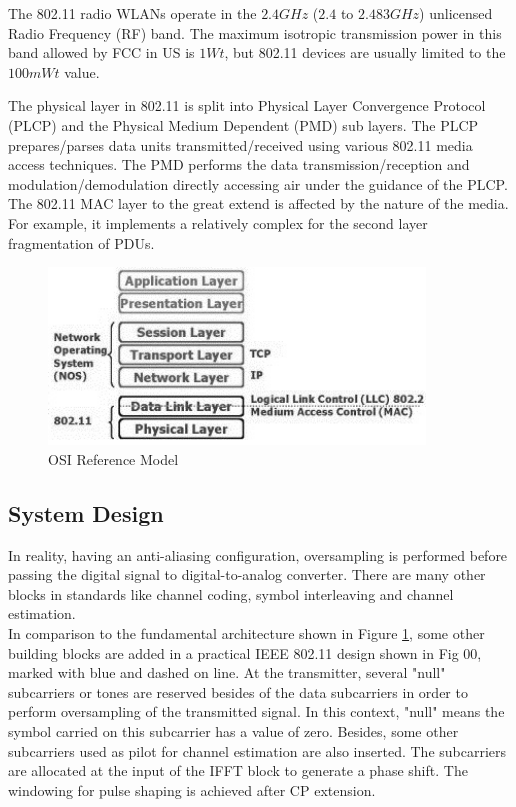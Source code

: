 The 802.11 radio WLANs operate in the $2.4 GHz$ ($2.4$ to $2.483 GHz$) unlicensed Radio Frequency (RF) band. The maximum isotropic transmission power in this band allowed by FCC in US is $1 Wt$, but 802.11 devices are usually limited to the $100 mWt$ value.

The physical layer in 802.11 is split into Physical Layer Convergence Protocol (PLCP) and the Physical Medium Dependent (PMD) sub layers. The PLCP prepares/parses data units transmitted/received using various 802.11 media access techniques. The PMD performs the data transmission/reception and modulation/demodulation directly accessing air under the guidance of the PLCP. The 802.11 MAC layer to the great extend is affected by the nature of the media. For example, it implements a relatively complex for the second layer fragmentation of PDUs.\\


\begin{figure}[h!]
\centering
\includegraphics[width=10cm]{content/fig/osi.JPG}
\caption{OSI Reference Model}
\label{fig:osi_model}
\end{figure}

\subsection{System Design}

In reality, having an anti-aliasing configuration, oversampling is performed before passing the digital signal to digital-to-analog converter. There are many other blocks in standards like channel coding, symbol interleaving and channel estimation.\\
In comparison to the fundamental architecture shown in Figure \ref{fig:osi_model}, some other building blocks are added in a practical IEEE 802.11 design shown in Fig 00, marked with blue and dashed on line. At the transmitter, several "null" subcarriers or tones are reserved besides of the data subcarriers in order to perform oversampling of the transmitted signal. In this context, "null" means the symbol carried on this subcarrier has a value of zero. Besides, some other subcarriers used as pilot for channel estimation are also inserted. The subcarriers are allocated at the input of the IFFT block to generate a phase shift. The windowing for pulse shaping is achieved after CP extension.\\

